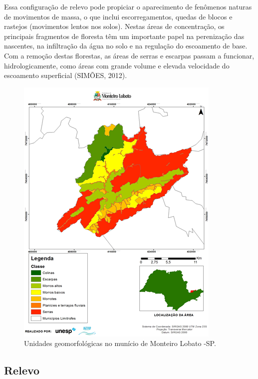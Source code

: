 Essa configuração de relevo pode propiciar o aparecimento de fenômenos naturas de movimentos de massa, o que inclui escorregamentos, quedas de blocos e rastejos (movimentos lentos nos solos). Nestas áreas de concentração, os principais fragmentos de floresta têm um importante papel na perenização das nascentes, na infiltração da água no solo e na regulação do escoamento de base. Com a remoção destas florestas, as áreas de serras e escarpas passam a funcionar, hidrologicamente, como áreas com grande volume e elevada velocidade do escoamento superficial (SIMÕES, 2012).
\clearpage
 \begin{figure}[h!]
 	\centering
 	\includegraphics[width=1\linewidth]{produtos/proddois/image28}
 	\caption{Unidades geomorfológicas no munício de Monteiro Lobato -SP.}
 	\label{fig:image28}
 \end{figure}

\subsection{Relevo}

